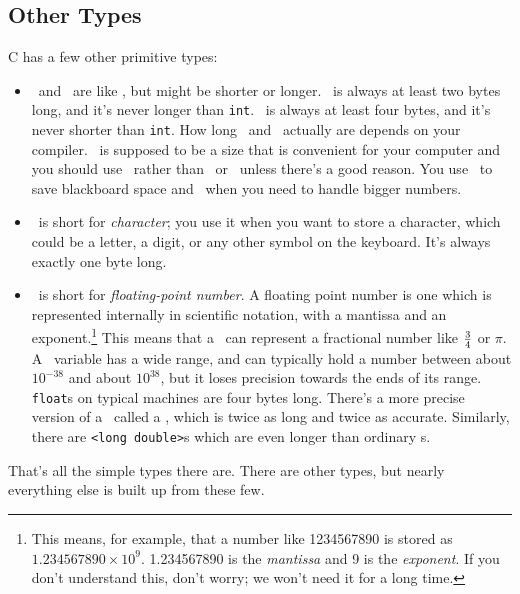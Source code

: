 \subsection{Other Types}

    C has a few other primitive types:

\begin{itemize}

\item \shortint\  and \longint\  are like \int, but might
be shorter or longer.  \shortint\ is always at least two bytes long, and
it's never longer than {\tt int}.  \longint\ is always at least four
bytes, and it's never shorter than {\tt int}.  How long \shortint\ and
\longint\ actually
are depends on your compiler.  \int\ is supposed to be a size that is
convenient for your computer and you should use \int\ rather than
\longint\ or \shortint\ unless there's a good
reason.  You use \shortint\ to save blackboard space and
\longint\ when you need to handle bigger numbers.

\item \char\ is short for {\em character}\/; you use it when you
want to store a character, which could be a letter, a digit, or any
other symbol on the keyboard.  It's always exactly one byte long.

\item \float\ is short for {\em floating-point number}\/.  A
floating point number is one which is represented internally in
scientific notation, with a mantissa and an exponent.\footnote{This
means, for example, that a number like 1234567890 is stored as
$1.234567890\times 10^9$.  1.234567890 is the {\em mantissa}\/ and 9 is
the {\em exponent}\/.  If you don't understand this, don't worry; we
won't need it for a long time.} This means that a \float\ can represent
a fractional number like $3\over 4$ or $\pi$.  A \float\ variable has a
wide range, and can typically hold a number between about $10^{-38}$ and
about $10^{38}$, but it loses precision towards the ends of its range.
{\tt float}s on typical machines are four bytes long.  There's a more
precise version of a \float\ called a \double, which is twice as long
and twice as accurate.  Similarly, there are
\verb+<+{\tt long double}\verb+>+s which are even longer than ordinary
\double s.

\end{itemize}

That's all the simple types there are.  There are other types, but
nearly everything else is built up from these few.

